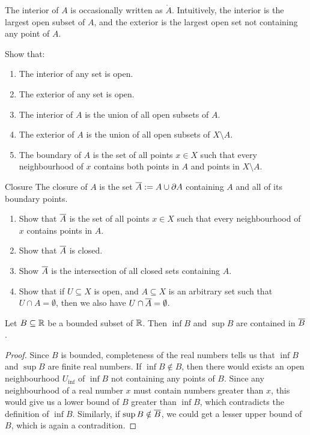 The interior of $A$ is occasionally written as $\mathring A$.
Intuitively, the interior is the largest open subset of $A$, and the exterior is the largest open set not containing any point of $A$.
\begin{exercise}
	Show that:
	\begin{enumerate}
		\item The interior of any set is open.
		\item The exterior of any set is open.
		\item The interior of $A$ is the union of all open subsets of $A$.
		\item The exterior of $A$ is the union of all open subsets of $X \setminus A$.
		\item The boundary of $A$ is the set of all points $x \in X$ such that every neighbourhood of $x$ contains both points in $A$ and points in $X \setminus A$.
	\end{enumerate}
\end{exercise}
\begin{importantdefinition}{Closure}{}
	The closure of $A$ is the set $\overline{{A}} := A \cup \partial A$ containing $A$ and all of its boundary points.
\end{importantdefinition}
\begin{exercise}
	\phantom{}
	\begin{enumerate}
		\item Show that $\overline{{A}}$ is the set of all points $x \in X$ such that every neighbourhood of $x$ contains points in $A$.
		\item Show that $\overline{{A}}$ is closed.
		\item Show $\overline{{A}}$ is the intersection of all closed sets containing $A$.
		\item Show that if $U \subseteq X$ is open, and $A \subseteq X$ is an arbitrary set such that $U \cap A = \emptyset$, then we also have $U \cap \overline{{A}} = \emptyset$.
	\end{enumerate}
\end{exercise}
\begin{theorem}
	\label{th:boundedinfsup}
	Let $B \subseteq \mathbb{R}$ be a bounded subset of $\mathbb{R}$. Then $\inf B$ and $\sup B$ are contained in $\overline{{B}}$.
\end{theorem}
\begin{proof}
	Since $B$ is bounded, completeness of the real numbers tells us that $\inf B$ and $\sup B$ are finite real numbers. If $\inf B \notin B$, then there would exists an open neighbourhood $U_{\inf}$ of $\inf B$ not containing any points of $B$. Since any neighbourhood of a real number $x$ must contain numbers greater than $x$, this would give us a lower bound of $B$ greater than $\inf B$, which contradicts the definition of $\inf B$. Similarly, if $\sup B \notin \overline{{B}}$, we could get a lesser upper bound of $B$, which is again a contradition.
\end{proof}
\clearpage

